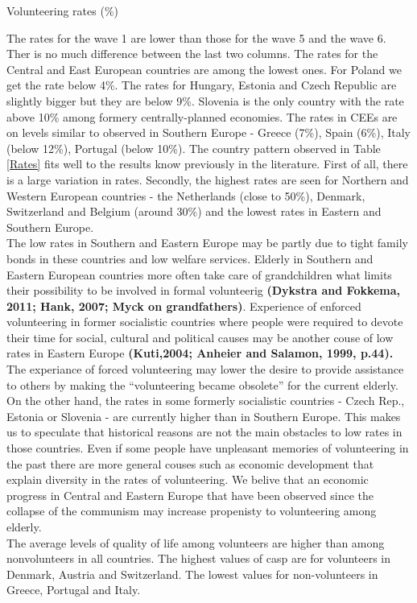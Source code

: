 \documentclass[10pt, letterpaper]{article}
\begin{document}
\begin{spacing}{1.4}
\begin{spacing}{.9}
\begin{table}[H]
\centering 
\caption{Volunteering rates (\%)}  
\begin{small} 
	 
      \label{Rates} 
\end{small}
\end{table}
\end{spacing}

The rates for the wave 1 are lower than those for the wave 5 and the wave 6. Ther is no much difference between the last two columns.  The rates for  the Central and East European countries are among the lowest ones.  For Poland we get the rate below 4\%. The rates for Hungary, Estonia and Czech Republic are slightly bigger but they are below 9\%. Slovenia is the only country with the rate above 10\% among formery centrally-planned economies. The rates in CEEs are on levels similar to observed in Southern Europe - Greece (7\%), Spain (6\%), Italy (below 12\%), Portugal (below 10\%).  The country pattern observed in Table \ref{Rates} fits well to the results know previously in the literature. First of all, there is a large variation in rates. Secondly,  the highest rates are seen for  Northern and Western European countries - the Netherlands (close to 50\%), Denmark, Switzerland and Belgium (around 30\%) and the lowest rates in Eastern and Southern Europe. \\
The low rates in Southern and Eastern Europe may be partly due to tight family bonds in these countries and low welfare services. Elderly in Southern and Eastern European countries more often take care of grandchildren what limits their possibility to be involved in formal volunteerig \textbf{(Dykstra and Fokkema, 2011; Hank, 2007; Myck on grandfathers)}. Experience of  enforced volunteering  in former socialistic countries where people were required to devote their time for social, cultural and political causes may be another couse of low rates in Eastern Europe \textbf{(Kuti,2004; Anheier and Salamon, 1999, p.44).} The experiance of forced volunteering  may lower the desire to provide assistance to others by making the “volunteering became obsolete” for the current elderly. On the other hand, the rates in some formerly socialistic countries - Czech Rep., Estonia or Slovenia - are currently higher than in Southern Europe. This makes us to speculate that historical reasons are not the main obstacles to low rates in those countries. Even if some people have unpleasant memories of volunteering in the past there are more general couses such as economic development that explain diversity in the rates of volunteering. We belive that an economic progress in Central and Eastern Europe that have been observed since the collapse of the communism may increase propenisty to volunteering among elderly. \\
The average levels of quality of life among volunteers are higher than among nonvolunteers in all countries. The highest values of casp are for volunteers in Denmark, Austria and Switzerland. The lowest values for non-volunteers in Greece, Portugal and Italy.



\end{spacing}
\end{document}
